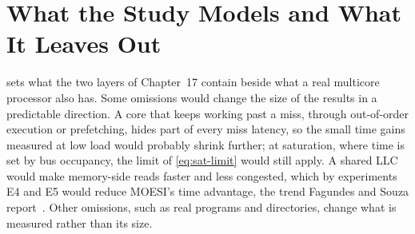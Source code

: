 \section{What the Study Models and What It Leaves Out}
\label{sec:lim-model}
%

 sets what the two layers of Chapter~17 contain beside what a
real multicore processor also has. Some omissions would change the size of the
results in a predictable direction. A core that keeps working past a miss, through
out-of-order execution or prefetching, hides part of every miss latency, so the
small time gains measured at low load would probably shrink further; at saturation,
where time is set by bus occupancy, the limit of \cref{eq:sat-limit} would still
apply. A shared LLC would make memory-side reads faster and less congested, which
by experiments E4 and E5 would reduce MOESI's time advantage, the trend Fagundes
and Souza report~\cite{fagundes2024evaluation}. Other omissions, such as real
programs and directories, change what is measured rather than its size.

